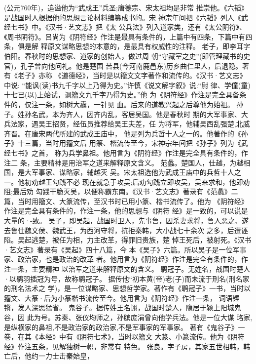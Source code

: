 \documentclass[12pt,UTF8]{ctexbook}
\begin{document}
(公元760年)，追谥他为“武成王”兵圣;唐德宗、宋太祖均是非常
推崇他。《六韬》是战国时人根据他的思想言论材料编纂成书的。宋
神宗年间把《六韬》列人《武经七书》中。《汉书·艺文志》把《太
公兵法》列入道家类，还有《太公阴符》、《周书阴符》。吕尚为《阴符经》作注是最具有条件的，上篇中有四条，下篇中有四条，俱是解
释原文谋略思想的本意的，是最具有权威性的注释。
老子，即李耳字伯阳。春秋时的思想家、道家的创始人，做过周
朝“守藏室之史”(即管理藏书的史官)，孔子曾向他问礼。他是楚国
苦县(今河南鹿邑东)历乡曲仁里人，后退隐。著有《老子》亦称
《道德经》，当时是以籀文文字著作和流传的。《汉书·艺文志》中说:
“能讽(读)书九千字以上乃得为史。”许慎《说文解字叙》说:“尉
律、学僮(童)十七已(以)上始试，讽籀文九千字乃得为史。”他
为《阴符经》作注是完全具备条件的，仅注一条，如树大纛，一针见
血。后来的道教兴起之后尊他为始祖。
孙子。姓孙名武，本为齐人，因齐内乱，客居吴国。他是春秋时
期的大军事家、大兵法家，遇吴王招贤，经伍员推荐给吴王夫差，任
为将军，他辅吴西乱强楚,北威齐晋。在唐宋两代所建的武成王庙中，
他是列为兵哲十人之一的。他著作的《孙子》十三篇，当时用籀文后
用篆、楷流传至今，宋神宗年间把《孙子》列为《武经七书》之首，
称为兵学鼻祖。他用言为《阴符经》作注是完全具有条件的，作注二
条，主要精神是用治军之道来解释原文含义。
范蠡。楚国人，仕越，为越相国，是大军事家、谋略家，辅越灭
吴。宋太祖选他为武成王庙中的兵哲十人之一。他初劝越王勾践不必
现在就急于攻吴;后劝勾践立即攻吴，吴来求和，他即劝阻;最后劝
勾践干脆灭吴，以便称霸东南。《汉书·艺文志》著录有《范蠡》二
篇，当时用籀文、大篆流传，至汉书时已用小篆、楷书流传了。他为
《阴符经》作注是完全具有条件的，作注一条，他的思想与《阴符
经》是一致的，可以说是大量的·-致。
吴子，即吴起，战国时卫人，先事鲁，因杀妻求将，鲁人恶之、遂去鲁仕魏文侯、魏武王，为西河守将，抗拒秦韩，大小战七十余次
之多，后遭诬陷。吴起逃楚，被任为相，力主改革，得罪旧贵族，楚
悼王死后，被射死。《汉书·艺文志》著录有《吴起》四十八篇，今
本《吴子》六篇。所以吴子是一位军事家、政治家，也是政治的改革
者。他用言为《阴符经》作注是完全有条件的，作注一条，主要精神
以治军之道来解释原文的含义。
鹖冠子。无姓名，战国时楚人·以鹖羽插冠为号，故称鹖冠子。
据传他“初本黄(帝)老(子)而未流于刑名(刑名家的刑名法术之
学)，是一位谋略家、思想哲学家。著作有《鹖冠子》一书，当时以
籀文、大篆·后为小篆楷书流传至今。他用言为《阴符经》作注一条，
词语铿锵，发人深思猛省。
鬼谷子。据传姓王名诩，战国时楚人，隐居于颍上阳城鬼谷，因
此为号。苏秦、张仪均师之，孙膑庞涓曾向他学兵法。他是一位大谋
略家,是纵横家的鼻祖,不是政治家的政治家,不是军事家的军事家。
著有《鬼谷子》一卷，在其《本经》中有《阴符七术》，当时以籀文
大篆、小篆流传。他为《阴符经》作注五条，见解独树一帜，非常有
特色。
张良。字子房，其家五世相韩，韩亡后，他约一力士击秦始皇，
\end{document}
